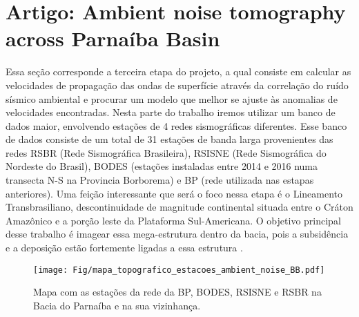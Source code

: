 \chapter{Artigo: Ambient noise tomography across Parnaíba Basin}

Essa seção corresponde a terceira etapa do projeto, a qual consiste em  calcular as velocidades de propagação das ondas de superfície através da correlação do ruído sísmico ambiental e procurar um modelo que melhor se ajuste às anomalias de velocidades encontradas. Nesta parte do trabalho iremos utilizar um banco de dados maior, envolvendo estações de 4 redes sismográficas diferentes. Esse banco de dados consiste de um total de 31 estações de banda larga provenientes das redes RSBR (Rede Sismográfica Brasileira), RSISNE (Rede Sismográfica do Nordeste do Brasil), BODES (estações instaladas entre 2014 e 2016 numa transecta N-S na Provincia Borborema) e BP (rede utilizada nas estapas anteriores). Uma feição interessante que será o foco nessa etapa é o Lineamento Transbrasiliano,  descontinuidade de magnitude continental situada entre o Cráton Amazônico e a porção leste da Plataforma Sul-Americana. O objetivo principal desse trabalho é imagear essa mega-estrutura dentro da bacia, pois a subsidência e a deposição estão fortemente ligadas a essa estrutura \citep{vaz_bacia_2007}.

\begin{figure}[!ht]
\begin{center}
\texttt{[image: Fig/mapa\_topografico\_estacoes\_ambient\_noise\_BB.pdf]}
\caption{Mapa com as estações da rede da BP, BODES, RSISNE e RSBR na Bacia do Parnaíba e na sua vizinhança.}
\label{mapa_sta_ambient_noise}
\end{center}
\end{figure}